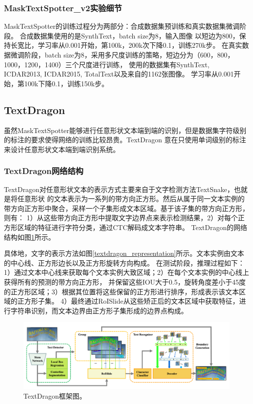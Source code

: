 \subsubsection{MaskTextSpotter\_v2实验细节}
MaskTextSpotter的训练过程分为两部分：合成数据集预训练和真实数据集微调阶段。
合成数据集使用的是SynthText\cite{gupta2016synthetic}，batch size为8，输入图像
以短边为800，保持长宽比，学习率从0.001开始，第100k，200k次下降0.1，训练270k步。
在真实数据微调阶段，batch size为8，采用多尺度训练的策略，短边分为（600，800，1000，1200，1400）三个尺度进行训练，
使用的数据集有SynthText, ICDAR2013, ICDAR2015, TotalText以及来自\cite{zhong2016deeptext}的1162张图像。
学习率从0.001开始，第100k下降0.1，训练150k步。

\subsection{TextDragon}
虽然MaskTextSpotter能够进行任意形状文本端到端的识别，但是数据集字符级别的标注的要求使得网络的训练比较昂贵。TextDragon
意在只使用单词级别的标注来设计任意形状文本端到端识别系统。
\subsubsection{TextDragon网络结构}
TextDragon对任意形状文本的表示方式主要来自于文字检测方法TextSnake\cite{long2018textsnake}，也就是将任意形状
的文本表示为一系列的带方向正方形。然后从属于同一文本实例的带方向正方形中聚合，采样一个子集形成文本区域。基于该子集的带方向正方形，
则有：
1）从这些带方向正方形中提取文字边界点来表示检测结果，2）对每个正方形区域的特征进行字符分类，通过CTC解码成文本字符串。
TextDragon的网络结构如图\ref{textdragon_framework}所示。

具体地，文字的表示方法如图\ref{textdragon_representation}所示。文本实例由文本的中心线、正方形边长以及正方形旋转方向构成。
在测试阶段，推理过程如下：1）通过文本中心线来获取每个文本实例大致区域；2）在每个文本实例的中心线上获得所有的预测的带方向正方形，
并保留这些IOU大于0.5，旋转角度差小于45度的正方形区域；3）根据其位置将这些保留的正方形进行排序，形成表示该文本区域的正方形子集。
4）最终通过RoISlide从这些矫正后的文本区域中获取特征，进行字符串识别，而文本边界由正方形子集形成的边界点构成。
\begin{figure}[htb]
    \centering
    \includegraphics[width=.98\textwidth]{figure/spotting/textdragon_framework.png} 
    \caption{TextDragon框架图。} 
    \label{textdragon_framework} 
\end{figure}

